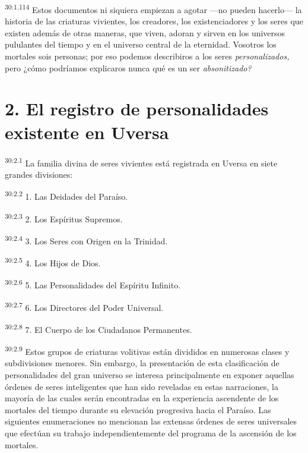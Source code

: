 \par
\textsuperscript{30:1.114} Estos documentos ni siquiera empiezan a agotar ---no pueden hacerlo--- la historia de las criaturas vivientes, los creadores, los existenciadores y los seres que existen además de otras maneras, que viven, adoran y sirven en los universos pululantes del tiempo y en el universo central de la eternidad. Vosotros los mortales sois personas; por eso podemos describiros a los seres \textit{personalizados,} pero ¿cómo podríamos explicaros nunca qué es un ser \textit{absonitizado?}

\section*{2. El registro de personalidades existente en Uversa}
\par
\textsuperscript{30:2.1} La familia divina de seres vivientes está registrada en Uversa en siete grandes divisiones:

\par
\textsuperscript{30:2.2} 1. Las Deidades del Paraíso.

\par
\textsuperscript{30:2.3} 2. Los Espíritus Supremos.

\par
\textsuperscript{30:2.4} 3. Los Seres con Origen en la Trinidad.

\par
\textsuperscript{30:2.5} 4. Los Hijos de Dios.

\par
\textsuperscript{30:2.6} 5. Las Personalidades del Espíritu Infinito.

\par
\textsuperscript{30:2.7} 6. Los Directores del Poder Universal.

\par
\textsuperscript{30:2.8} 7. El Cuerpo de los Ciudadanos Permanentes.

\par
\textsuperscript{30:2.9} Estos grupos de criaturas volitivas están divididos en numerosas clases y subdivisiones menores. Sin embargo, la presentación de esta clasificación de personalidades del gran universo se interesa principalmente en exponer aquellas órdenes de seres inteligentes que han sido reveladas en estas narraciones, la mayoría de las cuales serán encontradas en la experiencia ascendente de los mortales del tiempo durante su elevación progresiva hacia el Paraíso. Las siguientes enumeraciones no mencionan las extensas órdenes de seres universales que efectúan su trabajo independientemente del programa de la ascensión de los mortales.

